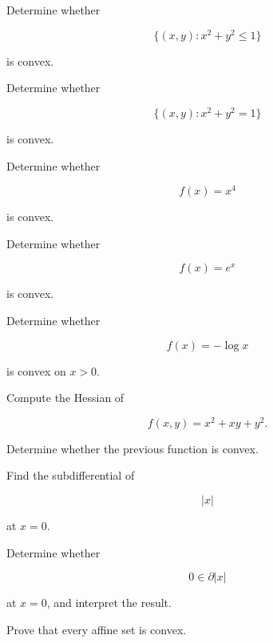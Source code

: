 \begin{exercise}[2]
Determine whether

\[
\{
(x,y):
x^2+y^2\leq1
\}
\]

is convex.
\end{exercise}

\begin{exercise}[2]
Determine whether

\[
\{
(x,y):
x^2+y^2=1
\}
\]

is convex.
\end{exercise}

\begin{exercise}[2]
Determine whether

\[
f(x)=x^4
\]

is convex.
\end{exercise}

\begin{exercise}[2]
Determine whether

\[
f(x)=e^x
\]

is convex.
\end{exercise}

\begin{exercise}[2]
Determine whether

\[
f(x)=-\log x
\]

is convex on \(x>0\).
\end{exercise}

\begin{exercise}[2]
Compute the Hessian of

\[
f(x,y)
=
x^2+xy+y^2.
\]
\end{exercise}

\begin{exercise}[2]
Determine whether the previous function is convex.
\end{exercise}

\begin{exercise}[2]
Find the subdifferential of

\[
|x|
\]

at \(x=0\).
\end{exercise}

\begin{exercise}[2]
Determine whether

\[
0\in\partial|x|
\]

at \(x=0\), and interpret the result.
\end{exercise}

\begin{exercise}[3]
Prove that every affine set is convex.
\end{exercise}

